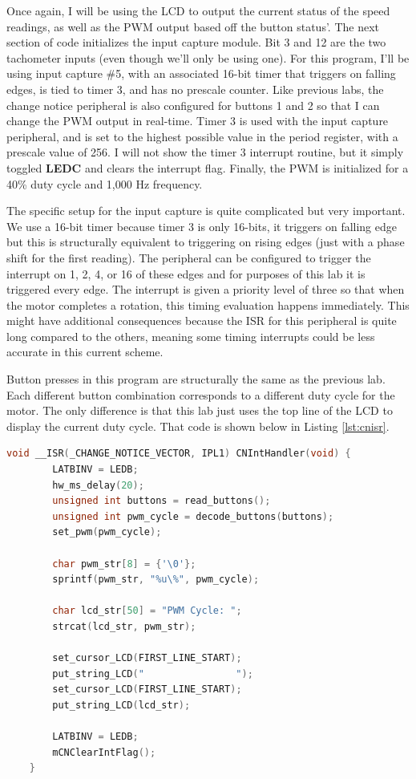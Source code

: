\documentclass[a4paper, 12pt]{article}
\begin{document}
Once again, I will be using the LCD to output the current status of the speed readings, as well as the PWM output based off the button status'. The next section of code initializes the input capture module. Bit 3 and 12 are the two tachometer inputs (even though we'll only be using one). For this program, I'll be using input capture \#5, with an associated 16-bit timer that triggers on falling edges, is tied to timer 3, and has no prescale counter. Like previous labs, the change notice peripheral is also configured for buttons 1 and 2 so that I can change the PWM output in real-time. Timer 3 is used with the input capture peripheral, and is set to the highest possible value in the period register, with a prescale value of 256. I will not show the timer 3 interrupt routine, but it simply toggled \textbf{LEDC} and clears the interrupt flag. Finally, the PWM is initialized for a 40\% duty cycle and 1,000 Hz frequency.

The specific setup for the input capture is quite complicated but very important. We use a 16-bit timer because timer 3 is only 16-bits, it triggers on falling edge but this is structurally equivalent to triggering on rising edges (just with a phase shift for the first reading). The peripheral can be configured to trigger the interrupt on 1, 2, 4, or 16 of these edges and for purposes of this lab it is triggered every edge. The interrupt is given a priority level of three so that when the motor completes a rotation, this timing evaluation happens immediately. This might have additional consequences because the ISR for this peripheral is quite long compared to the others, meaning some timing interrupts could be less accurate in this current scheme.

Button presses in this program are structurally the same as the previous lab. Each different button combination corresponds to a different duty cycle for the motor. The only difference is that this lab just uses the top line of the LCD to display the current duty cycle. That code is shown below in Listing \ref{lst:cnisr}.

	\begin{mdframed}[backgroundcolor=code-gray, roundcorner=10pt,
								innerleftmargin=5, innertopmargin=5, innerbottommargin=5]	
	\begin{lstlisting}[language=C, caption=Change Notice ISR, tabsize=2, label={lst:cnisr}]
	void __ISR(_CHANGE_NOTICE_VECTOR, IPL1) CNIntHandler(void) {
		LATBINV = LEDB;
		hw_ms_delay(20);
		unsigned int buttons = read_buttons();
		unsigned int pwm_cycle = decode_buttons(buttons);
		set_pwm(pwm_cycle);

		char pwm_str[8] = {'\0'};
		sprintf(pwm_str, "%u\%", pwm_cycle);
	
		char lcd_str[50] = "PWM Cycle: ";
		strcat(lcd_str, pwm_str);

		set_cursor_LCD(FIRST_LINE_START);
		put_string_LCD("				");
		set_cursor_LCD(FIRST_LINE_START);
		put_string_LCD(lcd_str);

		LATBINV = LEDB;
		mCNClearIntFlag();
	}
	\end{lstlisting}
	\end{mdframed}
	
\end{document}
